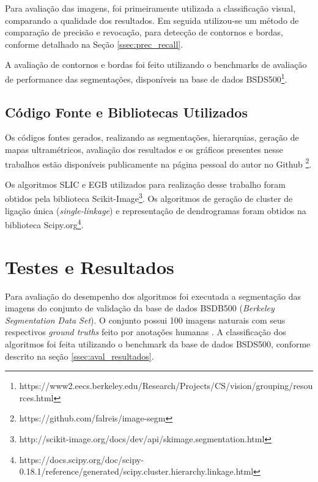 \begin{document}
Para avaliação das imagens, foi primeiramente utilizada a classificação visual, comparando a qualidade dos resultados. Em seguida utilizou-se um método de comparação de precisão e revocação, para detecção de contornos e bordas, conforme detalhado na Seção \ref{ssec:prec_recall}. 

A avaliação de contornos e bordas foi feito utilizando o benchmarks de avaliação de performance das segmentações, disponíveis na base de dados BSDS500\footnote{https://www2.eecs.berkeley.edu/Research/Projects/CS/vision/grouping/resources.html}.



\subsection{Código Fonte e Bibliotecas Utilizados} \label{ssec:cod_fonte}

Os códigos fontes gerados, realizando as segmentações, hierarquias, geração de mapas ultramétricos, avaliação dos resultados e os gráficos presentes nesse trabalhos estão disponíveis publicamente na página pessoal do autor no Github \footnote{https://github.com/falreis/image-segm}.

Os algoritmos SLIC e EGB utilizados para realização desse trabalho foram obtidos pela biblioteca Scikit-Image\footnote{http://scikit-image.org/docs/dev/api/skimage.segmentation.html}. 
Os algoritmos de geração de cluster de ligação única (\textit{single-linkage}) e representação de dendrogramas foram obtidos na biblioteca Scipy.org\footnote{https://docs.scipy.org/doc/scipy-0.18.1/reference/generated/scipy.cluster.hierarchy.linkage.html}. 


\section{Testes e Resultados} \label{sec:testes}

Para avaliação do desempenho dos algoritmos foi executada a segmentação das imagens do conjunto de validação da base de dados BSDB500 (\textit{Berkeley Segmentation Data Set}). O conjunto possui 100 imagens naturais com seus respectivos \textit{ground truths} feito por anotações humanas \cite{BSDS500}. A classificação dos algoritmos foi feita utilizando o benchmark da base de dados BSDS500, conforme descrito na seção \ref{ssec:aval_resultados}.
\end{document}
